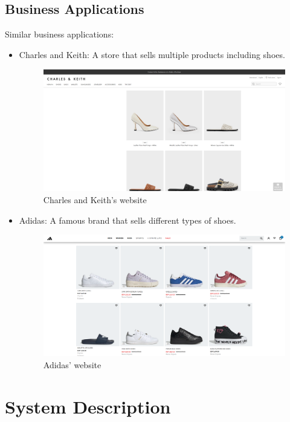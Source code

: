 \documentclass[12pt]{article}
\begin{document}
\subsection{Business Applications}
Similar business applications:
\begin{itemize}

\item
Charles and Keith: A store that sells multiple products including shoes.
 \begin{figure}[h]
\centering
\includegraphics[width=0.8\linewidth]{chK.png}
\caption{Charles and Keith's website}
\end{figure}
\end{itemize}
\newpage
\begin{itemize}
\item 
Adidas: A famous brand that sells different types of shoes.
 \begin{figure}[h]
\centering
\includegraphics[width=0.8\linewidth]{adidas.png}
\caption{Adidas' website}
\label{fig:woocommerce}
\end{figure}

 

\end{itemize}

\section{System Description}
\end{document}
